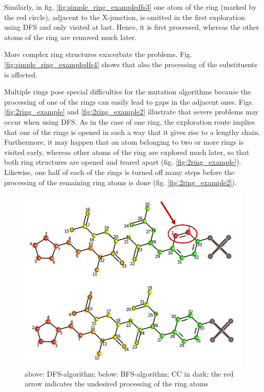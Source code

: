Similarly, in fig. \ref{fig:simple_ring_exampledfs3} one atom of the ring (marked by the red circle), adjacent to the X-junction, is omitted in the first exploration using DFS and only visited at last. Hence, it is first processed, whereas the other atoms of the ring are removed much later.

More complex ring structures exacerbate the problems. Fig. \ref{fig:simple_ring_exampledfs4} shows that also the processing of the substituents is affected.

Multiple rings pose special difficulties for the mutation algorithms because
the processing of one of the rings can easily lead to gaps in the adjacent
ones. Figs. \ref{fig:2ring_example} and  \ref{fig:2ring_example2} illustrate that severe problems may occur when using DFS.
As in the case of one ring, the exploration route implies that one
of the rings is opened in such a way that it gives rise to a lengthy chain.
Furthermore, it may happen that an atom belonging to two or more rings is visited early, whereas other atoms of the ring are explored much later, so that both ring structures are opened
and teared apart (fig. \ref{fig:2ring_example}). Likewise, one half of each of the
rings is turned off many steps before the processing of the remaining ring atoms is done (fig. \ref{fig:2ring_example2}). 

\begin{figure}
\includegraphics[scale=0.75]{simple_ring_exampledfs2_two_rows}\caption{above: DFS-algorithm; below: BFS-algorithm; CC in dark; the
red arrow indicates the undesired processing of the ring atoms}
\label{fig:simple_ring_exampledfs2}
\end{figure}

